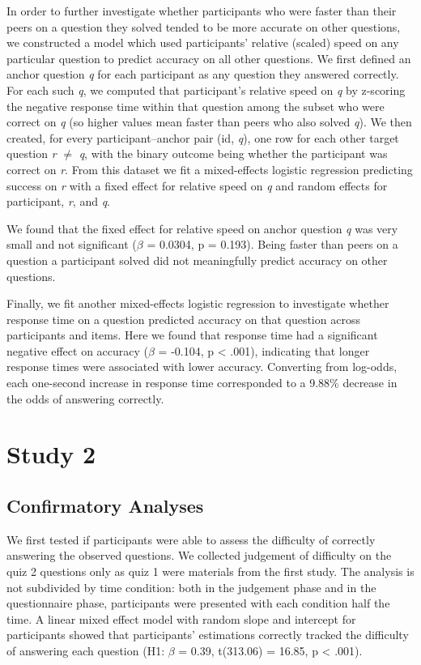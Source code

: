 \documentclass[
  10pt,
  letterpaper]{article}
\begin{document}
In order to further investigate whether participants who were faster than their peers on a question they solved tended to be more accurate on other questions, we constructed a model which used participants' relative (scaled) speed on any particular question to predict accuracy on all other questions. We first defined an anchor question \emph{q} for each participant as any question they answered correctly. For each such \emph{q}, we computed that participant's relative speed on \emph{q} by z-scoring the negative response time within that question among the subset who were correct on \emph{q} (so higher values mean faster than peers who also solved \emph{q}). We then created, for every participant--anchor pair (id, \emph{q}), one row for each other target question \emph{r} \(\neq\) \emph{q}, with the binary outcome being whether the participant was correct on \emph{r}. From this dataset we fit a mixed-effects logistic regression predicting success on \emph{r} with a fixed effect for relative speed on \emph{q} and random effects for participant, \emph{r}, and \emph{q}.

We found that the fixed effect for relative speed on anchor question \emph{q} was very small and not significant (\(\beta\) = 0.0304, p = 0.193). Being faster than peers on a question a participant solved did not meaningfully predict accuracy on other questions.

Finally, we fit another mixed-effects logistic regression to investigate whether response time on a question predicted accuracy on that question across participants and items. Here we found that response time had a significant negative effect on accuracy (\(\beta\) = -0.104, p \textless{} .001), indicating that longer response times were associated with lower accuracy. Converting from log-odds, each one-second increase in response time corresponded to a 9.88\% decrease in the odds of answering correctly.

\section{Study 2}\label{study-2}

\subsection{Confirmatory Analyses}\label{confirmatory-analyses}

We first tested if participants were able to assess the difficulty of correctly answering the observed questions. We collected judgement of difficulty on the quiz 2 questions only as quiz 1 were materials from the first study. The analysis is not subdivided by time condition: both in the judgement phase and in the questionnaire phase, participants were presented with each condition half the time. A linear mixed effect model with random slope and intercept for participants showed that participants' estimations correctly tracked the difficulty of answering each question (H1: \(\beta\) = 0.39, t(313.06) = 16.85, p \textless{} .001).
\end{document}
